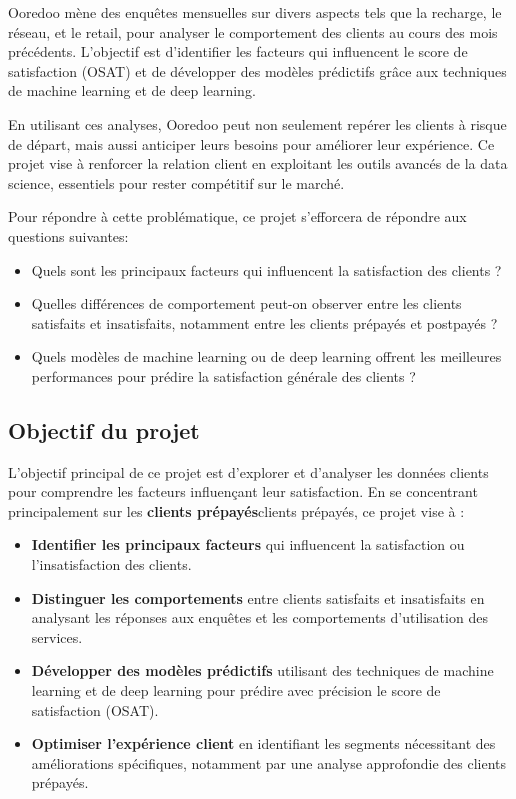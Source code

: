 Ooredoo mène des enquêtes mensuelles sur divers aspects tels que la recharge, le réseau, et le retail, pour analyser le comportement des clients au cours des mois précédents. L'objectif est d'identifier les facteurs qui influencent le score de satisfaction (OSAT) et de développer des modèles prédictifs grâce aux techniques de machine learning et de deep learning.\par

En utilisant ces analyses, Ooredoo peut non seulement repérer les clients à risque de départ, mais aussi anticiper leurs besoins pour améliorer leur expérience. Ce projet vise à renforcer la relation client en exploitant les outils avancés de la data science, essentiels pour rester compétitif sur le marché.\par

Pour répondre à cette problématique, ce projet s'efforcera de répondre aux questions suivantes:

\begin{itemize}
    \item Quels sont les principaux facteurs qui influencent la satisfaction des clients ?
    \item Quelles différences de comportement peut-on observer entre les clients satisfaits et insatisfaits, notamment entre les clients prépayés et postpayés ?
    \item Quels modèles de machine learning ou de deep learning offrent les meilleures performances pour prédire la satisfaction générale des clients ?
\end{itemize}

\subsection{Objectif du projet}

L'objectif principal de ce projet est d'explorer et d'analyser les données clients pour comprendre les facteurs influençant leur satisfaction. En se concentrant principalement sur les \textbf{clients prépayés}clients prépayés, ce projet vise à :

\begin{itemize}
    \item \textbf{Identifier les principaux facteurs} qui influencent la satisfaction ou l'insatisfaction des clients.
    \item \textbf{Distinguer les comportements} entre clients satisfaits et insatisfaits en analysant les réponses aux enquêtes et les comportements d’utilisation des services.
    \item \textbf{Développer des modèles prédictifs} utilisant des techniques de machine learning et de deep learning pour prédire avec précision le score de satisfaction (OSAT).
    \item \textbf{Optimiser l’expérience client} en identifiant les segments nécessitant des améliorations spécifiques, notamment par une analyse approfondie des clients prépayés.
\end{itemize}

